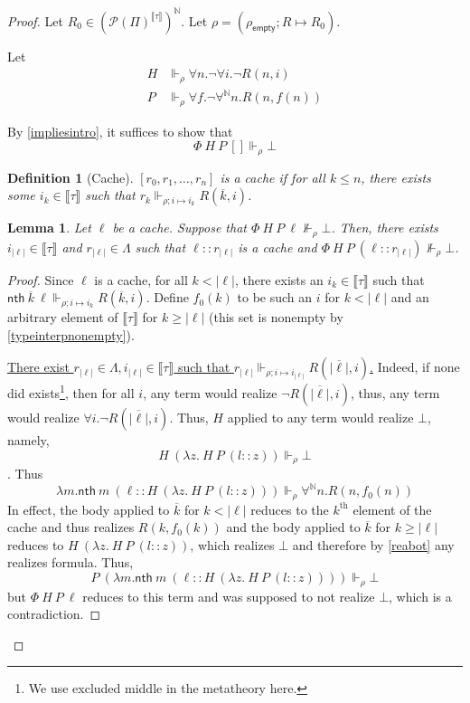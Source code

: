 \documentclass{article}
\newcommand{\N}{\mathbb{N}}
\newcommand{\depforall}[1]{\forall^\N #1.}
\newcommand{\realizes}{\Vdash}
\newcommand{\typeinterp}[1]{{\llbracket #1 \rrbracket}}
\newcommand{\powerset}[1]{\mathcal{P}(#1)}
\newcommand{\emptyval}{{\rho_\mathsf{empty}}}
\newcommand{\nth}{\mathsf{nth}}
\newcommand{\length}[1]{{|#1|}}
\newtheorem{definition}{Definition}
\newtheorem{lemma}{Lemma}
\begin{document}
\begin{proof}
Let $R_0 \in (\powerset{\Pi}^\typeinterp{\tau})^\N$. Let $\rho = (\emptyval; R \mapsto R_0)$.

Let
\begin{align*}
    H & \realizes_\rho \forall n. \neg \forall i. \neg R(n, i) \\
    P & \realizes_\rho \forall f. \neg \depforall{n} R(n, f(n))
\end{align*}

By \cref{impliesintro}, it suffices to show that
\[\Phi\ H\ P\ [] \realizes_\rho \bot \]

\begin{definition}[Cache]
    $[r_0, r_1, \dots, r_n]$ is a cache if for all $k \le n$, there exists some $i_k \in \typeinterp{\tau}$ such that $r_k \realizes_{\rho; i \mapsto i_k} R(\overline{k}, i)$.
\end{definition}

\begin{lemma}\label{growcache}
    Let $\ell$ be a cache.
    Suppose that $\Phi\ H\ P\ \ell \not\realizes_\rho \bot$.
    Then, there exists $i_\length{\ell} \in \typeinterp{\tau}$ and $r_\length{\ell} \in \Lambda$ such that $\ell :: r_\length{\ell}$ is a cache and $\Phi\ H\ P\ (\ell :: r_\length{\ell}) \not\realizes_\rho \bot$.
\end{lemma}

\begin{proof}
    Since $\ell$ is a cache, for all $k < \length{\ell}$, there exists an $i_k \in \typeinterp{\tau}$ such that $\nth\ \overline{k}\ \ell \realizes_{\rho; i \mapsto i_k} R(\overline{k}, i)$. Define $f_0(k)$ to be such an $i$ for $k < \length{\ell}$ and an arbitrary element of $\typeinterp{\tau}$ for $k \ge \length{\ell}$ (this set is nonempty by \cref{typeinterpnonempty}).

    \ul{There exist $r_\length{\ell} \in \Lambda, i_\length{\ell} \in \typeinterp{\tau}$ such that $r_\length{\ell} \realizes_{\rho; i \mapsto i_\length{\ell}} R(\overline{\length\ell}, i)$.}
    Indeed, if none did exists\footnote{We use excluded middle in the metatheory here.}, then for all $i$, any term would realize $\neg R(\overline{\length\ell}, i)$, thus, any term would realize $\forall i. \neg R(\overline{\length{\ell}}, i)$.
    Thus, $H$ applied to any term would realize $\bot$, namely,
    \[ H\ (\lambda z.\ H\ P\ (l :: z)) \realizes_\rho \bot \].
    Thus
    \[\lambda m. \nth\ m\ (\ell :: H\ (\lambda z.\ H\ P\ (l :: z))) \realizes_\rho \depforall{n} R(n, f_0(n))\]
    In effect, the body applied to $\overline{k}$ for $k < \length{\ell}$ reduces to the $k^\text{th}$ element of the cache and thus realizes $R(k, f_0(k))$ and the body applied to $\overline{k}$ for $k \ge \length{\ell}$ reduces to $H\ (\lambda z.\ H\ P\ (l :: z))$, which realizes $\bot$ and therefore by \cref{reabot} any realizes formula.
    Thus,
    \[P\ (\lambda m. \nth\ m\ (\ell :: H\ (\lambda z.\ H\ P\ (l :: z)))) \realizes_\rho \bot\]
    but $\Phi\ H\ P\ \ell$ reduces to this term and was supposed to not realize $\bot$, which is a contradiction.


\end{proof}
\end{proof}
\end{document}
